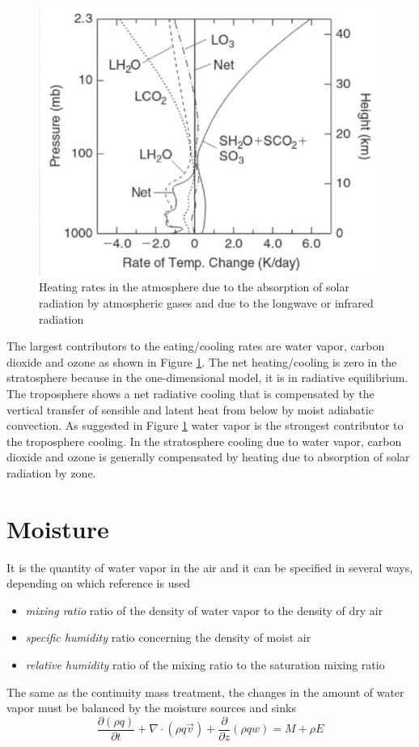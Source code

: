 \begin{figure}[h!]
	\centering
	\includegraphics[width=0.5\linewidth]{uploads/image13.png}
	\caption{Heating rates in the atmosphere due to the absorption of solar radiation by atmospheric gases and due to the longwave or infrared radiation}
	\label{figl}
\end{figure}
The largest contributors to the eating/cooling rates are water vapor, carbon dioxide and ozone as shown in Figure \ref{figl}.
The net heating/cooling is zero in the stratosphere because in the one-dimensional model, it is in radiative equilibrium. The troposphere shows a net radiative cooling that is compensated by the vertical transfer of sensible and latent heat from below by moist adiabatic convection. As suggested in Figure \ref{figl} water vapor is the strongest contributor to the troposphere cooling. In the stratosphere cooling due to water vapor, carbon dioxide and ozone is generally compensated by heating due to absorption of solar radiation by zone.

\section{Moisture}
It is the quantity of water vapor in the air and it can be specified in several ways, depending on which reference is used
\begin{itemize}
	\item \textit{mixing ratio} ratio of the density of water vapor to the density of dry air
	\item \textit{specific humidity} ratio concerning the density of moist air
	\item \textit{relative humidity} ratio of the mixing ratio to the saturation mixing ratio
\end{itemize}
The same as the continuity mass treatment, the changes in the amount of water vapor must be balanced by the moisture sources and sinks
\begin{equation}\label{eq3}
	\frac{\partial (\rho q)}{\partial t} + \nabla \cdot (\rho q \vec{v}) + \frac{\partial}{\partial z} (\rho q w) = M + \rho E
\end{equation}


